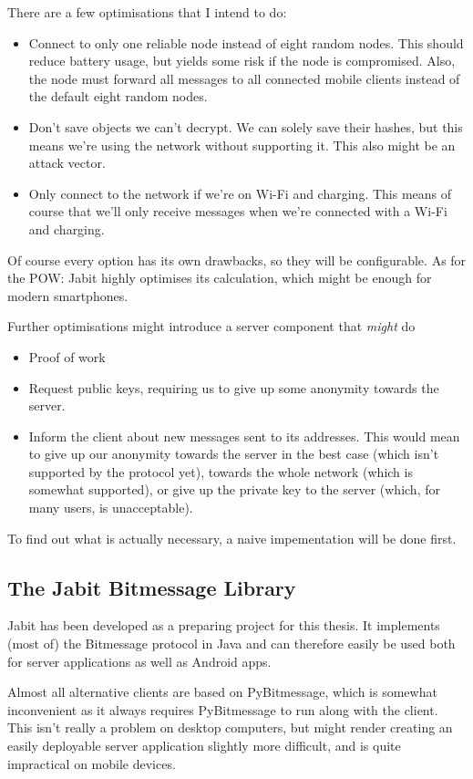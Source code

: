 \documentclass{bfh}
\begin{document}
  There are a few optimisations that I intend to do:
  \begin{itemize}
    \item Connect to only one reliable node instead of eight random nodes. This should reduce battery usage, but yields some risk if the node is compromised. Also, the node must forward all messages to all connected mobile clients instead of the default eight random nodes.
    \item Don't save objects we can't decrypt. We can solely save their hashes, but this means we're using the network without supporting it. This also might be an attack vector.
    \item Only connect to the network if we're on Wi-Fi and charging. This means of course that we'll only receive messages when we're connected with a Wi-Fi and charging.
  \end{itemize}
  Of course every option has its own drawbacks, so they will be configurable. As for the \ac{POW}: Jabit highly optimises its calculation, which might be enough for modern smartphones.

  Further optimisations might introduce a server component that \textit{might} do
  \begin{itemize}
    \item Proof of work
    \item Request public keys, requiring us to give up some anonymity towards the server.
    \item Inform the client about new messages sent to its addresses. This would mean to give up our anonymity towards the server in the best case (which isn't supported by the protocol yet), towards the whole network (which is somewhat supported), or give up the private key to the server (which, for many users, is unacceptable).
  \end{itemize}

  To find out what is actually necessary, a naive impementation will be done first.

  \subsection{The Jabit Bitmessage Library}
  Jabit has been developed as a preparing project for this thesis. It implements (most of) the Bitmessage protocol in Java and can therefore easily be used both for server applications as well as Android apps.

  Almost all alternative clients are based on PyBitmessage, which is somewhat inconvenient as it always requires PyBitmessage to run along with the client. This isn't really a problem on desktop computers, but might render creating  an easily deployable server application slightly more difficult, and is quite impractical on mobile devices.
\end{document}
